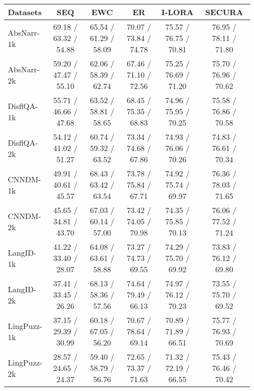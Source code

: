 \begin{table*}[h]
\centering
\small
\begin{tabular}{lccccc}
\toprule
\textbf{Datasets} & \textbf{SEQ}& \textbf{EWC}& \textbf{ER} & \textbf{I-LORA} & \textbf{SECURA} \\
\midrule
AbsNarr-1k& 69.18 / 63.32 / 54.88
& 65.54 / 61.29 / 58.09
& 70.07 / 73.84 / 74.78
& 75.57 / 76.75 / 70.81
& 76.95 / 78.11 / 71.80
\\

AbsNarr-2k& 
59.20 / 47.47 / 55.10
& 62.06 / 58.39 / 62.74
& 67.46 / 71.10 / 72.56
& 
75.25 / 76.69 / 71.20
& 


75.70 / 76.96 / 70.62
\\
DisflQA-1k& 
55.71 / 46.66 / 47.68
& 63.52 / 58.81 / 58.65
& 68.45 / 75.35 / 68.83
& 74.96 / 75.95 / 70.25
& 
75.58 / 76.86 / 70.58
\\

DisflQA-2k& 
54.12 / 41.02 / 51.27
& 60.74 / 59.32 / 63.52
& 73.34 / 74.68 / 67.86
& 
74.93 / 76.06 / 70.26
& 



74.83 / 76.61 / 70.34
\\
CNNDM-1k& 49.91 / 40.61 / 45.57
& 68.43 / 63.42 / 63.54
& 73.78 / 75.84 / 67.71
& 74.92 / 75.74 / 69.97
& 76.36 / 78.03 / 71.65
\\

CNNDM-2k& 
45.65 / 34.81 / 43.70
& 67.03 / 60.14 / 57.00
& 73.42 / 74.05 / 70.98
& 
74.35 / 75.85 / 70.13
& 


76.06 / 77.52 / 71.24
\\

LangID-1k& 
41.22 / 33.40 / 28.07
& 64.08 / 63.61 / 58.88
& 73.27 / 74.73 / 69.55
& 74.29 / 75.70 / 69.92
& 
73.83 / 76.12 / 69.80
\\

LangID-2k& 
37.41 / 33.45 / 26.26
& 68.13 / 58.36 / 57.56
& 74.64 / 79.49 / 66.13
& 
74.97 / 76.12 / 70.23
& 



73.55 / 75.70 / 69.52
\\
LingPuzz-1k& 37.15 / 29.39 / 30.99
& 60.18 / 67.05 / 56.20
& 70.67 / 78.64 / 69.14
& 70.89 / 71.89 / 66.51
& 75.77 / 76.93 / 70.69
\\

LingPuzz-2k& 
28.57 / 24.65 / 24.37
& 59.40 / 58.79 / 56.76
& 72.65 / 73.37 / 71.63
& 
71.32 / 72.19 / 66.55
& 


75.43 / 76.46 / 70.42
\\


\end{tabular}
\end{table*}
